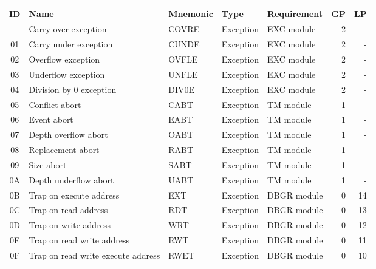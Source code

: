 \begin{table}[hbt!] %

    \begin{center}

    \begin{tabular}{|c|l|l|l|l|r|r|}

        \hline
        ID & Name & Mnemonic & Type & Requirement & GP & LP \\
        \hline
        \addlinespace[10pt]
        \hline
        00 & Carry over exception & COVRE & Exception & EXC module & 2 & - \\
        \hline
        01 & Carry under exception & CUNDE & Exception & EXC module & 2 & - \\
        \hline
        02 & Overflow exception & OVFLE & Exception & EXC module & 2 & - \\
        \hline
        03 & Underflow exception & UNFLE & Exception & EXC module & 2 & - \\
        \hline
        04 & Division by 0 exception & DIV0E & Exception & EXC module & 2 & - \\
        \hline
        05 & Conflict abort & CABT & Exception & TM module & 1 & - \\
        \hline
        06 & Event abort & EABT & Exception & TM module & 1 & - \\
        \hline
        07 & Depth overflow abort & OABT & Exception & TM module & 1 & - \\
        \hline
        08 & Replacement abort & RABT & Exception & TM module & 1 & - \\
        \hline
        09 & Size abort & SABT & Exception & TM module & 1 & - \\
        \hline
        0A & Depth underflow abort & UABT & Exception & TM module & 1 & - \\
        \hline
        0B & Trap on execute address & EXT & Exception & DBGR module & 0 & 14 \\
        \hline
        0C & Trap on read address & RDT & Exception & DBGR module & 0 & 13 \\
        \hline
        0D & Trap on write address & WRT & Exception & DBGR module & 0 & 12 \\
        \hline
        0E & Trap on read write address & RWT & Exception & DBGR module & 0 & 11 \\
        \hline
        0F & Trap on read write execute address & RWET & Exception & DBGR module & 0 & 10 \\

\end{tabular}
\end{center}
\end{table}
